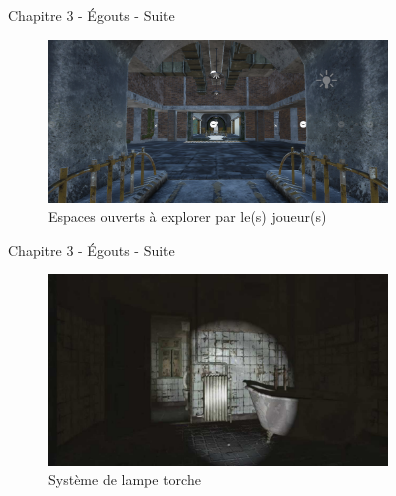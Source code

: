 \begin{frame}{Chapitre 3 - Égouts - Suite}
\begin{figure}
    \centering
    \includegraphics[width=9cm]{img/egouts/2.PNG}
    \caption{Espaces ouverts à explorer par le(s) joueur(s)}
    \label{fig:galaxy}
\end{figure}
\end{frame}

\begin{frame}{Chapitre 3 - Égouts - Suite}
\begin{figure}
    \centering
    \includegraphics[width=9cm]{img/egouts/light.jpg}
    \caption{Système de lampe torche}
    \label{fig:galaxy}
\end{figure}
\end{frame}